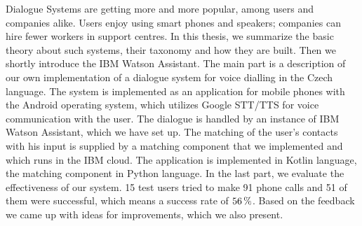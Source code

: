 \documentclass[12pt]{report}
\begin{document}

Dialogue Systems are getting more and more popular, among users and companies alike.
Users enjoy using smart phones and speakers; companies can hire fewer workers in support
centres. In this thesis, we summarize the basic theory about such systems, their taxonomy
and how they are built. Then we shortly introduce the IBM Watson Assistant. The main
part is a description of our own implementation of a dialogue system for voice dialling in
the Czech language. The system is implemented as an application for mobile phones with
the Android operating system, which utilizes Google STT/TTS for voice communication
with the user. The dialogue is handled by an instance of IBM Watson Assistant, which we
have set up. The matching of the user’s contacts with his input is supplied by a matching
component that we implemented and which runs in the IBM cloud. The application is
implemented in Kotlin language, the matching component in Python language. In the
last part, we evaluate the effectiveness of our system. 15 test users tried to make 91 phone
calls and 51 of them were successful, which means a success rate of \(56\,\rm \%\). Based on the
feedback we came up with ideas for improvements, which we also present.
\end{document}
